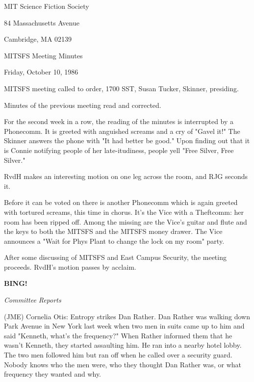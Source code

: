 \documentclass[12pt]{article}
\newcommand{\bing}{{\bf BING!} }
\newcommand{\goto}[1]{\bing \vskip 12pt \centerline{{\em{#1}}}}
\begin{document}
\begin{center}

MIT Science Fiction Society 

84 Massachusetts Avenue

Cambridge, MA 02139

\vspace{12pt}

MITSFS Meeting Minutes 

Friday, October 10, 1986

\end{center}
 
\vspace{18pt}

\setlength{\parskip}{6pt}

\noindent
MITSFS meeting called to order, 1700 SST,
Susan Tucker, Skinner, presiding.

Minutes of the previous meeting read and corrected.

For the second week in a row, the reading of the minutes is interrupted by a Phonecomm. It is greeted with anguished screams and a cry of "Gavel it!" The Skinner answers the phone with "It had better be good." Upon finding out that it is Connie notifying people of her late-itudiness, people yell "Free Silver, Free Silver."

RvdH makes an interesting motion on one leg across the room, and RJG seconds it.

Before it can be voted on there is another Phonecomm which is again greeted with tortured screams, this time in chorus. It's the Vice with a Theftcomm: her room has been ripped off. Among the missing are the Vice's guitar and flute and the keys to both the MITSFS and the MITSFS money drawer. The Vice announces a "Wait for Phys Plant to change the lock on my room" party.

After some discussing of MITSFS and East Campus Security, the meeting proceeds. RvdH's motion passes by acclaim.

\goto{Committee Reports}

(JME) Cornelia Otis: Entropy strikes Dan Rather. Dan Rather was walking down Park Avenue in New York last week when two men in suits came up to him and said "Kenneth, what's the frequency?" When Rather informed them that he wasn't Kenneth, they started assaulting him. He ran into a nearby hotel lobby. The two men followed him but ran off when he called over a security guard. Nobody knows who the men were, who they thought Dan Rather was, or what frequency they wanted and why.
\end{document}
